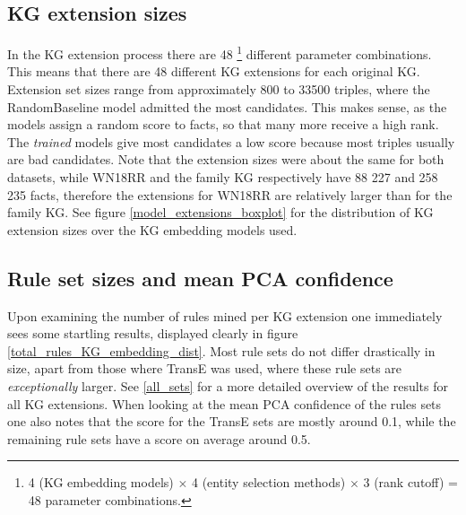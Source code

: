 \subsection{KG extension sizes}
In the KG extension process there are 48 \footnote{4 (KG embedding models) $\times$ 4 (entity selection methods) $\times$ 3 (rank cutoff) = 48 parameter combinations.} different parameter combinations. This means that there are 48 different KG extensions for each original KG. Extension set sizes range from approximately 800 to 33500 triples, where the RandomBaseline model admitted the most candidates. This makes sense, as the models assign a random score to facts, so that many more receive a high rank. The \textit{trained} models give most candidates a low score because most triples usually are bad candidates. Note that the extension sizes were about the same for both datasets, while WN18RR and the family KG respectively have 88 227 and 258 235 facts, therefore the extensions for WN18RR are relatively larger than for the family KG. See figure \ref{model_extensions_boxplot} for the distribution of KG extension sizes over the KG embedding models used.

\subsection{Rule set sizes and mean PCA confidence}
\label{TransE_sucks} 
Upon examining the number of rules mined per KG extension one immediately sees some startling results, displayed clearly in figure \ref{total_rules_KG_embedding_dist}. Most rule sets do not differ drastically in size, apart from those where TransE was used, where these rule sets are \textit{exceptionally} larger. See \cref{all_sets} for a more detailed overview of the results for all KG extensions. When looking at the mean PCA confidence of the rules sets one also notes that the score for the TransE sets are mostly around 0.1, while the remaining rule sets have a score on average around 0.5.


